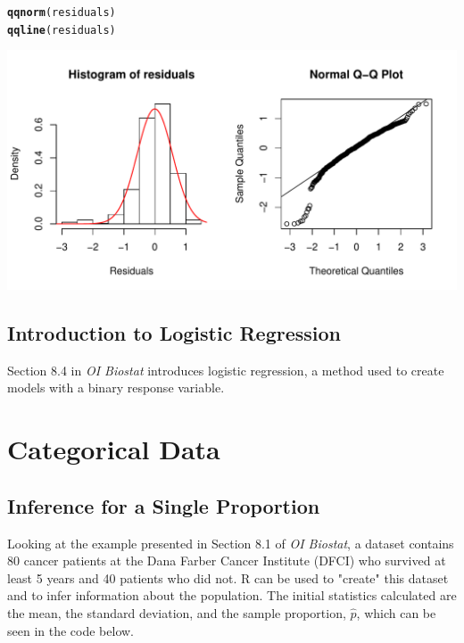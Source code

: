 \documentclass{report}\usepackage[]{graphicx}\usepackage[]{color}
\makeatletter
\def\maxwidth{ %
  \ifdim\Gin@nat@width>\linewidth
    \linewidth
  \else
    \Gin@nat@width
  \fi
}
\newcommand{\hlstd}[1]{\textcolor[rgb]{0.345,0.345,0.345}{#1}}%
\newcommand{\hlkwd}[1]{\textcolor[rgb]{0.737,0.353,0.396}{\textbf{#1}}}%
\newenvironment{kframe}{%
 \def\at@end@of@kframe{}%
 \ifinner\ifhmode%
  \def\at@end@of@kframe{\end{minipage}}%
  \begin{minipage}{\columnwidth}%
 \fi\fi%
 \def\FrameCommand##1{\hskip\@totalleftmargin \hskip-\fboxsep
 \colorbox{shadecolor}{##1}\hskip-\fboxsep
     \hskip-\linewidth \hskip-\@totalleftmargin \hskip\columnwidth}%
 \MakeFramed {\advance\hsize-\width
   \@totalleftmargin\z@ \linewidth\hsize
   \@setminipage}}%
 {\par\unskip\endMakeFramed%
 \at@end@of@kframe}
\newenvironment{knitrout}{}{} %
\makeatother
\begin{document}
\begin{knitrout}
\begin{kframe}
\begin{alltt}
\hlkwd{qqnorm}\hlstd{(residuals)}
\hlkwd{qqline}\hlstd{(residuals)}
\end{alltt}
\end{kframe}

{\centering \includegraphics[width=\maxwidth]{figure/unnamed-chunk-152-1} 

}



\end{knitrout}


\section{Introduction to Logistic Regression}
Section 8.4 in \textit{OI Biostat} introduces logistic regression, a method used to create models with a binary response variable.  

\newpage
\chapter{Categorical Data}
\minitoc


\section{Inference for a Single Proportion}
Looking at the example presented in Section 8.1 of \textit{OI Biostat}, a dataset contains 80 cancer patients at the Dana Farber Cancer Institute (DFCI) who survived at least 5 years and 40 patients who did not.  \textsf{R} can be used to "create" this dataset and to infer information about the population.  The initial statistics calculated are the mean, the standard deviation, and the sample proportion, $\hat{p}$, which can be seen in the code below.  
\end{document}
